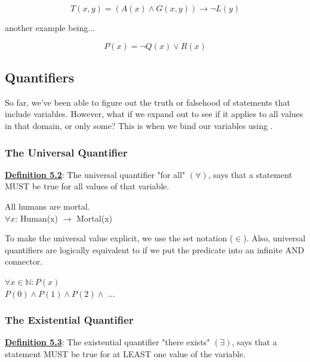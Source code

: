 \begin{example}
    \begin{displaymath}
    T(x,y) = (A(x) \land G(x,y)) \rightarrow \neg L(y)
    \end{displaymath}
    \begin{center}
        another example being...
    \end{center}
    \begin{displaymath}
        P(x) = \neg Q(x) \lor R(x)
    \end{displaymath}
\end{example}

\subsection{Quantifiers}
So far, we've been able to figure out the truth or falsehood of statements that include variables. However, what if we expand out to see if it applies to all values in that domain, or only some? This is when we bind our variables using .

\subsubsection{The Universal Quantifier}
\textbf{\underline{Definition 5.2}}: The universal quantifier "for all" $(\forall)$, says that a statement MUST be true for all values of that variable.

\begin{example}
    All humans are mortal.\\
    $\forall x$: Human(x) $\rightarrow$ Mortal(x)
\end{example}

To make the universal value explicit, we use the set notation ($\in$). Also, universal quantifiers are logically equivalent to if we put the predicate into an infinite AND connector.

\begin{example}
    $\forall x \in \mathbb{N} : P(x)$\\
    $P(0) \land P(1) \land P(2) \land $ ...
\end{example}

\subsubsection{The Existential Quantifier}
\textbf{\underline{Definition 5.3}}: The existential quantifier "there exists" $(\exists)$, says that a statement MUST be true for at LEAST one value of the variable.

